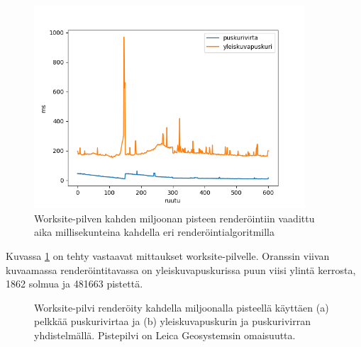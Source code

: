 \begin{figure}[h]
    \centering
    \includegraphics[width=0.9\textwidth]{tuloksia/worksite_ms_per_frame.png}
    \caption{Worksite-pilven kahden miljoonan pisteen renderöintiin vaadittu aika millisekunteina kahdella eri renderöintialgoritmilla}
    \label{ws_ms}
\end{figure}

Kuvassa \ref{ws_ms} on tehty vastaavat mittaukset worksite-pilvelle. Oranssin viivan kuvaamassa renderöintitavassa on yleiskuvapuskurissa puun viisi ylintä kerrosta, 1862 solmua ja 481663 pistettä.

\begin{figure}
    \caption{Worksite-pilvi renderöity kahdella miljoonalla pisteellä käyttäen (a) pelkkää puskurivirtaa ja (b) yleiskuvapuskurin ja puskurivirran yhdistelmällä. Pistepilvi on Leica Geosystemsin omaisuutta.}
    \label{img:worksite_vertailu}
\end{figure}

